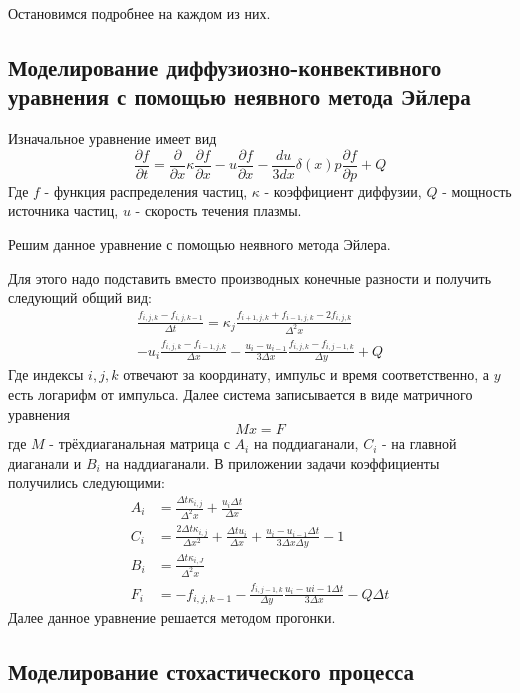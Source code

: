 \documentclass[a4paper,14pt]{extarticle} %
\begin{document}
Остановимся подробнее на каждом из них.
\subsection{Моделирование диффузиозно-конвективного уравнения с помощью неявного метода Эйлера}
Изначальное уравнение имеет вид
\begin{equation}
\frac{\partial f}{\partial t} = \frac{\partial}{\partial x} \kappa \frac{\partial f}{\partial x} - u \frac{\partial f}{\partial x} - \frac{du}{3dx} \delta(x) p \frac{\partial f}{\partial p} +Q
\end{equation}
Где $f$ - функция распределения частиц, $\kappa$ - коэффициент диффузии, $Q$ - мощность источника частиц, $u$ - скорость течения плазмы.

Решим данное уравнение с помощью неявного метода Эйлера.

Для этого надо подставить вместо производных конечные разности и получить следующий общий вид:
\begin{multline}
\frac{f_{i,j,k} - f_{i,j,k-1}}{\Delta t} = \kappa_{j} \frac{f_{i+1,j,k}+f_{i-1,j,k}-2f_{i,j,k}}{\Delta^2 x} \\
- u_i\frac{f_{i,j,k}-f_{i-1,j,k}}{\Delta x}-\frac{u_i-u_{i-1}}{3\Delta x}\frac{f_{i,j,k}-f_{i,j-1,k}}{\Delta y} + Q
\end{multline}
Где индексы $i, j, k$ отвечают за координату, импульс и время соответственно, а $y$ есть логарифм от импульса.
Далее система записывается в виде матричного уравнения
\begin{equation}
Mx=F
\end{equation}
где $M$ - трёхдиаганальная матрица с $A_i$ на поддиаганали, $C_i$ - на главной диаганали и $B_i$ на наддиаганали. В приложении задачи коэффициенты получились следующими:
\begin{eqnarray}
A_i&=\frac{\Delta t \kappa_{i,j}}{\Delta^2 x} + \frac{u_i\Delta t}{\Delta x}\\
C_i&=\frac{2\Delta t \kappa_{i,j}}{\Delta x^2} + \frac{\Delta t u_i}{\Delta x} + \frac{u_i-u_{i-1}\Delta t}{3\Delta x \Delta y} - 1\\
B_i&=\frac{\Delta t \kappa_{i,J}}{\Delta^2 x}\\
F_i&=-f_{i,j,k-1}-\frac{f_{i,j-1,k}}{\Delta y} \frac{u_i-u{i-1}\Delta t}{3\Delta x} - Q\Delta t
\end{eqnarray} 
Далее данное уравнение решается методом прогонки.
\subsection{Моделирование стохастического процесса}
\end{document}
